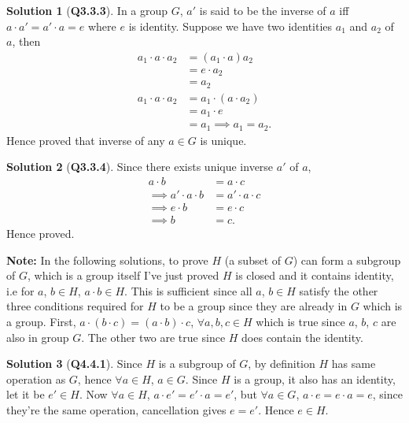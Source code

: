 \documentclass{article}
\theoremstyle{definition}
\newtheorem*{sol}{Solution}
\begin{document}
\begin{sol}[\textbf{Q3.3.3}]
	In a group $G$, $a'$ is said to be the inverse of $a$ iff $a\cdot a' = a'\cdot a = e$ where $e$ is identity. Suppose we have two identities $a_1$ and $a_2$ of $a$, then
	\begin{align}
		a_1\cdot a\cdot a_2 & = (a_1\cdot a)a_2       \\
		                    & = e\cdot a_2            \\
		                    & = a_2                   \\
		a_1\cdot a\cdot a_2 & = a_1\cdot (a\cdot a_2) \\
		                    & = a_1\cdot e            \\
		                    & = a_1
		\implies a_1 = a_2.
	\end{align}
	Hence proved that inverse of any $a\in G$ is unique.
\end{sol}

\begin{sol}[\textbf{Q3.3.4}]
	\label{sol:cancelling}
	Since there exists unique inverse $a'$ of $a$,
	\begin{align}
		a\cdot b                  & = a\cdot c          \\
		\implies a'\cdot a\cdot b & = a' \cdot a\cdot c \\
		\implies e\cdot b         & = e\cdot c          \\
		\implies b                & = c.
	\end{align}
	Hence proved.
\end{sol}
\textbf{Note:} In the following solutions, to prove $H$ (a subset of $G$) can form a subgroup of $G$, which is a group itself I've just proved $H$ is closed and it contains identity, i.e for $a$, $b \in H$,  $a\cdot b \in H$. This is sufficient since all $a$, $b\in H$ satisfy the other three conditions required for $H$ to be a group since they are already in $G$ which is a group. First, $a\cdot(b\cdot c) = (a\cdot b)\cdot c$, $\forall a, b, c \in H$ which is true since $a$, $b$, $c$ are also in group $G$. The other two are true since $H$ does contain the identity.
\begin{sol}[\textbf{Q4.4.1}]
	Since $H$ is a subgroup of $G$, by definition $H$ has same operation as $G$, hence $\forall a\in H$, $a\in G$. Since $H$ is a group, it also has an identity, let it be $e'\in H$. Now $\forall a \in H$, $a\cdot e' = e'\cdot a = e'$, but $\forall a \in G$, $a\cdot e = e\cdot a = e$, since they're the same operation, cancellation gives $e=e'$. Hence $e\in H$.
\end{sol}
\end{document}
